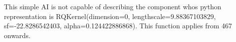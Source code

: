 This simple AI is not capable of describing the component whos python representation is RQKernel(dimension=0, lengthscale=9.88367103829, sf=-22.8286542403, alpha=0.124422886868). This function applies from  467 onwards.